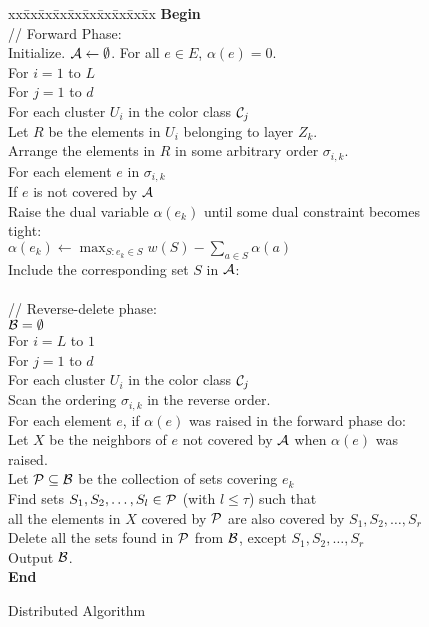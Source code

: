 \documentclass[11pt]{article}
\newcommand{\calA} {{\cal A}}
\newcommand{\calB} {{\cal B}}
\newcommand{\calC} {{\cal C}}
\newcommand{\calP} {{\cal P}}
\begin{document}
\begin{figure}
\begin{center}
\begin{boxedminipage}{\hsize}
\begin{small}
\begin{tabbing}
xx\=xx\=xx\=xx\=xx\=xx\=xx\=xx\=xx\=xx\kill
\textbf{Begin}  \\
\> // Forward Phase:\\
\> Initialize. $\calA \leftarrow \emptyset$. For all $e\in E$, $\alpha(e)=0$.\\
\> For $i=1$ to $L$\\
\> \> For $j=1$ to $d$\\
\> \> \> For each cluster $U_i$ in the color class $\calC_j$\\
\> \> \> \> Let $R$ be the elements in $U_i$ belonging to layer $Z_k$.\\
\> \> \> \> Arrange the elements in $R$ in some arbitrary order $\sigma_{i,k}$.\\
\> \> \> \> For each element $e$ in $\sigma_{i,k}$\\
\> \> \> \> \> If $e$ is not covered by $\calA$\\
\> \> \> \> \> \> Raise the dual variable $\alpha(e_k)$ until some dual constraint becomes tight:\\
\> \> \> \> \> \> \> $\alpha(e_k) \leftarrow \max_{S:e_k\in S} w(S) - \sum_{a\in S} \alpha(a)$\\
\> \> \> \> \> \> \> Include the corresponding set $S$ in $\calA$:\\
\>\\
\> // Reverse-delete phase:\\
\> $\calB = \emptyset$\\
\> For $i=L$ to $1$\\
\> \> For $j=1$ to $d$\\
\> \> \> For each cluster $U_i$ in the color class $\calC_j$\\
\> \> \> \> Scan the ordering $\sigma_{i,k}$ in the reverse order.\\
\> \> \> \> For each element $e$, if $\alpha(e)$ was raised in the forward phase do:\\
\> \> \> \> \> Let $X$ be the neighbors of $e$ not covered by $\calA$ when $\alpha(e)$ was raised.\\
\> \> \> \> \> Let $\calP\subseteq \calB$ be the collection of sets covering $e_k$\\
\> \> \> \> \> Find sets $S_1, S_2, \ldots, S_l\in \calP$ (with $l\leq \tau$) such that\\
\> \> \> \> \> \> all the elements in $X$ covered by $\calP$ are also covered by $S_1, S_2, \ldots, S_r$\\
\> \> \> \> \> Delete all the sets found in $\calP$ from $\calB$, except $S_1, S_2, \ldots, S_r$\\
\> Output $\calB$.\\
\textbf{End}
\end{tabbing}
\end{small}
\end{boxedminipage}
\end{center}
\caption{Distributed Algorithm}
\label{fig:dist}
\end{figure}
\end{document}
